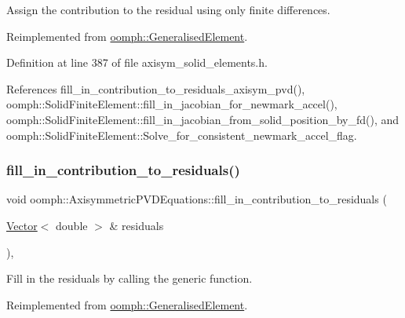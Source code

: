 Assign the contribution to the residual using only finite differences. 



Reimplemented from \hyperlink{classoomph_1_1GeneralisedElement_a6ae09fc0d68e4309ac1b03583d252845}{oomph\+::\+Generalised\+Element}.



Definition at line 387 of file axisym\+\_\+solid\+\_\+elements.\+h.



References fill\+\_\+in\+\_\+contribution\+\_\+to\+\_\+residuals\+\_\+axisym\+\_\+pvd(), oomph\+::\+Solid\+Finite\+Element\+::fill\+\_\+in\+\_\+jacobian\+\_\+for\+\_\+newmark\+\_\+accel(), oomph\+::\+Solid\+Finite\+Element\+::fill\+\_\+in\+\_\+jacobian\+\_\+from\+\_\+solid\+\_\+position\+\_\+by\+\_\+fd(), and oomph\+::\+Solid\+Finite\+Element\+::\+Solve\+\_\+for\+\_\+consistent\+\_\+newmark\+\_\+accel\+\_\+flag.

\mbox{\label{classoomph_1_1AxisymmetricPVDEquations_a432b436b9e82c78cc06baefedc6029d4}} 
\subsubsection{\texorpdfstring{fill\+\_\+in\+\_\+contribution\+\_\+to\+\_\+residuals()}{fill\_in\_contribution\_to\_residuals()}}
{\footnotesize\ttfamily void oomph\+::\+Axisymmetric\+P\+V\+D\+Equations\+::fill\+\_\+in\+\_\+contribution\+\_\+to\+\_\+residuals (\begin{DoxyParamCaption}\item[{\hyperlink{classoomph_1_1Vector}{Vector}$<$ double $>$ \&}]{residuals }\end{DoxyParamCaption})\hspace{0.3cm}{\ttfamily [inline]}, {\ttfamily [virtual]}}



Fill in the residuals by calling the generic function. 



Reimplemented from \hyperlink{classoomph_1_1GeneralisedElement_a310c97f515e8504a48179c0e72c550d7}{oomph\+::\+Generalised\+Element}.



